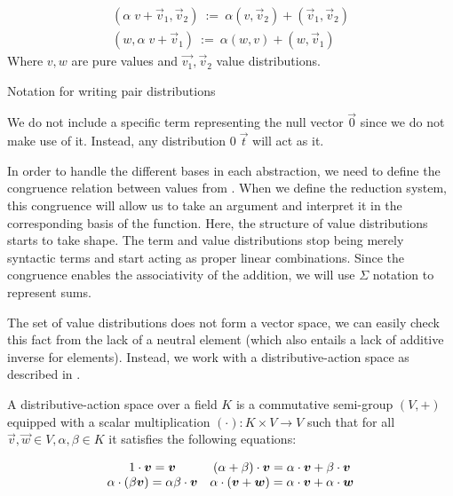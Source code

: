 \documentclass[runningheads,orivec]{llncs}
\def\Pair#1#2{(#1,#2)} %
\begin{document}
 \begin{table*}[tb]
  \[
    \begin{array}{c}
      \Pair{\alpha\; v+\vec{v}_1}{\vec{v}_2}~ := ~\alpha\Pair{v}{\vec{v}_2} + \Pair{\vec{v}_1}{\vec{v}_2}\\
      \Pair{w}{\alpha\; v+\vec{v}_1}~ := ~\alpha\Pair{w}{v} + \Pair{w}{\vec{v}_1}
    \end{array}
  \]
  Where $v,w$ are pure values and $\vec{v_1}, \vec{v}_2$ value distributions.
  \caption{Notation for writing pair distributions}
  \label{tab:PairsNotation}
 \end{table*}

\begin{remark}
  We do not include a specific term representing the null vector $\vec{0}$ since we do not make use of it. Instead, any distribution $0\;\vec{t}$ will act as it.
\end{remark}

In order to handle the different bases in each abstraction, we need to define the congruence relation between values from . When we define the reduction system, this congruence will allow us to take an argument and interpret it in the corresponding basis of the function. Here, the structure of value distributions starts to take shape. The term and value distributions stop being merely syntactic terms and start acting as proper linear combinations. Since the congruence enables the associativity of the addition, we will use $\Sigma$ notation to represent sums.

The set of value distributions does not form a vector space, we can easily check this fact from the lack of a neutral element (which also entails a lack of additive inverse for elements). Instead, we work with a distributive-action space as described in \cite{DiazCaroMalherbe2022}.

A distributive-action space over a field $K$ is a commutative semi-group $(V,+)$ equipped with a scalar multiplication $(\cdot): K\times V\to V$ such that for all $\vec{v},\vec{w}\in V, \alpha,\beta\in K$ it satisfies the following equations:

\[
\begin{array}{c c}
1\cdot \vec{v} = \vec{v} & (\alpha + \beta)\cdot\vec{v} = \alpha\cdot\vec{v} + \beta\cdot\vec{v}\\
\alpha\cdot(\beta\vec{v}) = \alpha\beta\cdot \vec{v} & \alpha\cdot(\vec{v} + \vec{w}) = \alpha\cdot\vec{v} + \alpha\cdot\vec{w}
\end{array}
\]
\end{document}
